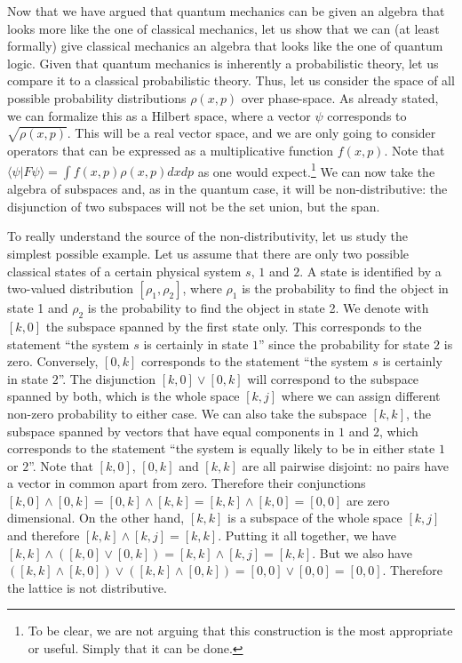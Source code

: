 \documentclass[11pt, executivepaper]{article}
\begin{document}
Now that we have argued that quantum mechanics can be given an algebra that looks more like the one of classical mechanics, let us show that we can (at least formally) give classical mechanics an algebra that looks like the one of quantum logic. Given that quantum mechanics is inherently a probabilistic theory, let us compare it to a classical probabilistic theory. Thus, let us consider the space of all possible probability distributions $\rho(x,p)$ over phase-space. As already stated, we can formalize this as a Hilbert space, where a vector $\psi$ corresponds to $\sqrt{\rho(x,p)}$. This will be a real vector space, and we are only going to consider operators that can be expressed as a multiplicative function $f(x,p)$. Note that $\langle \psi | F \psi \rangle = \int f(x,p) \rho(x,p) dx dp$ as one would expect.\footnote{To be clear, we are not arguing that this construction is the most appropriate or useful. Simply that it can be done.}  We can now take the algebra of subspaces and, as in the quantum case, it will be non-distributive: the disjunction of two subspaces will not be the set union, but the span.

To really understand the source of the non-distributivity, let us study the simplest possible example. Let us assume that there are only two possible classical states of a certain physical system $s$, $1$ and $2$. A state is identified by a two-valued distribution $[\rho_1, \rho_2]$, where $\rho_1$ is the probability to find the object in state 1 and $\rho_2$ is the probability to find the object in state 2. We denote with $[k,0]$ the subspace spanned by the first state only. This corresponds to the statement ``the system $s$ is certainly in state $1$'' since the probability for state $2$ is zero. Conversely, $[0,k]$ corresponds to the statement ``the system $s$ is certainly in state $2$''. The disjunction $[k,0] \vee [0,k]$ will correspond to the subspace spanned by both, which is the whole space $[k,j]$ where we can assign different non-zero probability to either case. We can also take the subspace $[k,k]$, the subspace spanned by vectors that have equal components in $1$ and $2$, which corresponds to the statement ``the system is equally likely to be in either state $1$ or $2$''. Note that $[k,0]$, $[0,k]$ and $[k,k]$ are all pairwise disjoint: no pairs have a vector in common apart from zero. Therefore their conjunctions $[k,0] \wedge [0,k] = [0,k] \wedge [k,k] = [k,k] \wedge [k,0] = [0,0]$ are zero dimensional. On the other hand, $[k,k]$ is a subspace of the whole space $[k,j]$ and therefore $[k,k] \wedge [k,j] = [k,k]$. Putting it all together, we have $[k,k] \wedge ( [k,0] \vee [0,k] ) = [k,k] \wedge [k,j] = [k,k]$. But we also have $( [k,k] \wedge [k,0] ) \vee ( [k,k] \wedge [0,k] ) = [0,0] \vee [0,0] = [0,0]$. Therefore the lattice is not distributive.
\end{document}
